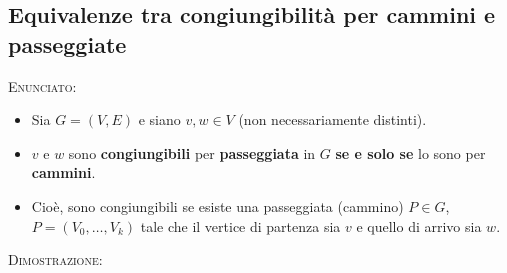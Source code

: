 \documentclass[10pt]{article}
\begin{document}
\subsection{Equivalenze tra congiungibilità per cammini e passeggiate}
\textsc{Enunciato:}
\begin{itemize}
\item
Sia $G = (V,E)$ e siano $v,w \in V$ (non necessariamente distinti).
\item
$v$ e $w$ sono \textbf{congiungibili} per \textbf{passeggiata} in $G$ \textbf{se e solo se} lo sono per \textbf{cammini}.
\item
Cioè, sono congiungibili se esiste una passeggiata (cammino) $P \in G$, $P = (V_0, \dotso, V_k)$ tale che il vertice di partenza sia $v$ e quello di arrivo sia $w$.
\end{itemize}
\textsc{Dimostrazione:}
\end{document}
